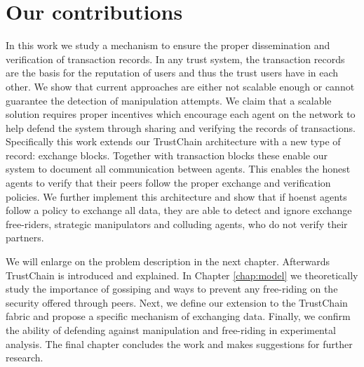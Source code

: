 
\section{Our contributions}
In this work we study a mechanism to ensure the proper dissemination and verification of transaction
records. In any trust system, the transaction records are the basis for the reputation of users and 
thus the trust users have in each other. We show that current approaches are either not scalable 
enough or cannot guarantee the detection of manipulation attempts. We claim that a scalable solution
requires proper incentives which encourage each agent on the network to help defend the system through
sharing and verifying the records of transactions. Specifically this work extends our TrustChain 
architecture with a new type of record: exchange blocks. Together with transaction blocks these 
enable our system to document all communication between agents. This enables the honest agents to 
verify that their peers follow the proper exchange and verification policies. We further implement
this architecture and show that if hoenst agents follow a policy to exchange all data, they are 
able to detect and ignore exchange free-riders, strategic manipulators and colluding agents, who do 
not verify their partners.

We will enlarge on the problem description in the next chapter. Afterwards TrustChain is introduced
and explained. In Chapter \ref{chap:model} we theoretically study the importance of gossiping and 
ways to prevent any free-riding on the security offered through peers. Next, we define our extension
to the TrustChain fabric and propose a specific mechanism of exchanging data. Finally, we confirm the 
ability of defending against manipulation and free-riding in experimental analysis. 
The final chapter concludes the work and makes suggestions for further research.